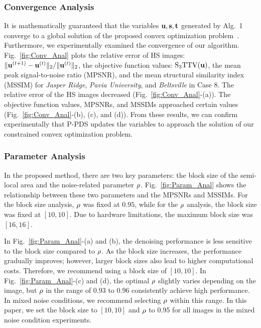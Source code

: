 \subsubsection{Convergence Analysis}
\label{subsubsec:ConvAnal}

It is mathematically guaranteed that the variables $\mathbf{u}, \mathbf{s}, \mathbf{t}$ generated by Alg.~1 converge to a global solution of the proposed convex optimization problem~\cite{Pock2011PPDS}.
Furthermore, we experimentally examined the convergence of our algorithm.
Fig.~\ref{fig:Conv_Anal} plots the relative error of HS images: $\| \mathbf{u}^{(t+1)} - \mathbf{u}^{(t)} \|_2 / \| \mathbf{u}^{(t)}\|_{2}$, the objective function values: ${\text{S}_{3} \text{TTV}}(\mathbf{u})$, the mean peak signal-to-noise ratio (MPSNR), and the mean structural similarity index (MSSIM) for \textit{Jasper Ridge},  \textit{Pavia University}, and \textit{Beltsville} in Case 8.
The relative error of the HS images decreased (Fig.~\ref{fig:Conv_Anal}-(a)).
The objective function values, MPSNRs, and MSSIMs approached certain values (Fig.~\ref{fig:Conv_Anal}-(b), (c), and (d)).
From these results, we can confirm experimentally that P-PDS updates the variables to approach the solution of our constrained convex optimization problem.


\subsubsection{Parameter Analysis}
\label{subsubsec:ParamAnal}

In the proposed method, there are two key parameters: the block size of the semi-local area and the noise-related parameter $\rho$. Fig.~\ref{fig:Param_Anal} shows the relationship between these two parameters and the MPSNRs and MSSIMs. For the block size analysis, $\rho$ was fixed at $0.95$, while for the $\rho$ analysis, the block size was fixed at $[10, 10]$. Due to hardware limitations, the maximum block size was $[16, 16]$.

In Fig.~\ref{fig:Param_Anal}-(a) and (b), the denoising performance is less sensitive to the block size compared to $\rho$. As the block size increases, the performance gradually improves; however, larger block sizes also lead to higher computational costs. Therefore, we recommend using a block size of $[10, 10]$.
In Fig.~\ref{fig:Param_Anal}-(c) and (d), the optimal $\rho$ slightly varies depending on the image, but $\rho$ in the range of $0.93$ to $0.96$ consistently achieve high performance. In mixed noise conditions, we recommend selecting $\rho$ within this range. In this paper, we set the block size to $[10, 10]$ and $\rho$ to $0.95$ for all images in the mixed noise condition experiments.



